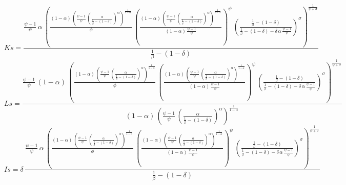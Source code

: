 \begin{dmath*}
Ks = \frac{\frac{{{\psi}}-1}{{{\psi}}}\, {{\alpha}}\, \left(\frac{\left(1-{{\alpha}}\right)\, \left(\frac{{{\psi}}-1}{{{\psi}}}\, \left(\frac{{{\alpha}}}{\frac{1}{{{\beta}}}-\left(1-{{\delta}}\right)}\right)^{{{\alpha}}}\right)^{\frac{1}{1-{{\alpha}}}}}{{{\phi}}}\, \left(\frac{\left(1-{{\alpha}}\right)\, \left(\frac{{{\psi}}-1}{{{\psi}}}\, \left(\frac{{{\alpha}}}{\frac{1}{{{\beta}}}-\left(1-{{\delta}}\right)}\right)^{{{\alpha}}}\right)^{\frac{1}{1-{{\alpha}}}}}{\left(1-{{\alpha}}\right)\, \frac{{{\psi}}-1}{{{\psi}}}}\right)^{{{\psi}}}\, \left(\frac{\frac{1}{{{\beta}}}-\left(1-{{\delta}}\right)}{\frac{1}{{{\beta}}}-\left(1-{{\delta}}\right)-{{\delta}}\, {{\alpha}}\, \frac{{{\psi}}-1}{{{\psi}}}}\right)^{{{\sigma}}}\right)^{\frac{1}{{{\psi}}+{{\sigma}}}}}{\frac{1}{{{\beta}}}-\left(1-{{\delta}}\right)}
\end{dmath*}
\begin{dmath*}
Ls = \frac{\frac{{{\psi}}-1}{{{\psi}}}\, \left(1-{{\alpha}}\right)\, \left(\frac{\left(1-{{\alpha}}\right)\, \left(\frac{{{\psi}}-1}{{{\psi}}}\, \left(\frac{{{\alpha}}}{\frac{1}{{{\beta}}}-\left(1-{{\delta}}\right)}\right)^{{{\alpha}}}\right)^{\frac{1}{1-{{\alpha}}}}}{{{\phi}}}\, \left(\frac{\left(1-{{\alpha}}\right)\, \left(\frac{{{\psi}}-1}{{{\psi}}}\, \left(\frac{{{\alpha}}}{\frac{1}{{{\beta}}}-\left(1-{{\delta}}\right)}\right)^{{{\alpha}}}\right)^{\frac{1}{1-{{\alpha}}}}}{\left(1-{{\alpha}}\right)\, \frac{{{\psi}}-1}{{{\psi}}}}\right)^{{{\psi}}}\, \left(\frac{\frac{1}{{{\beta}}}-\left(1-{{\delta}}\right)}{\frac{1}{{{\beta}}}-\left(1-{{\delta}}\right)-{{\delta}}\, {{\alpha}}\, \frac{{{\psi}}-1}{{{\psi}}}}\right)^{{{\sigma}}}\right)^{\frac{1}{{{\psi}}+{{\sigma}}}}}{\left(1-{{\alpha}}\right)\, \left(\frac{{{\psi}}-1}{{{\psi}}}\, \left(\frac{{{\alpha}}}{\frac{1}{{{\beta}}}-\left(1-{{\delta}}\right)}\right)^{{{\alpha}}}\right)^{\frac{1}{1-{{\alpha}}}}}
\end{dmath*}
\begin{dmath*}
Is = {{\delta}}\, \frac{\frac{{{\psi}}-1}{{{\psi}}}\, {{\alpha}}\, \left(\frac{\left(1-{{\alpha}}\right)\, \left(\frac{{{\psi}}-1}{{{\psi}}}\, \left(\frac{{{\alpha}}}{\frac{1}{{{\beta}}}-\left(1-{{\delta}}\right)}\right)^{{{\alpha}}}\right)^{\frac{1}{1-{{\alpha}}}}}{{{\phi}}}\, \left(\frac{\left(1-{{\alpha}}\right)\, \left(\frac{{{\psi}}-1}{{{\psi}}}\, \left(\frac{{{\alpha}}}{\frac{1}{{{\beta}}}-\left(1-{{\delta}}\right)}\right)^{{{\alpha}}}\right)^{\frac{1}{1-{{\alpha}}}}}{\left(1-{{\alpha}}\right)\, \frac{{{\psi}}-1}{{{\psi}}}}\right)^{{{\psi}}}\, \left(\frac{\frac{1}{{{\beta}}}-\left(1-{{\delta}}\right)}{\frac{1}{{{\beta}}}-\left(1-{{\delta}}\right)-{{\delta}}\, {{\alpha}}\, \frac{{{\psi}}-1}{{{\psi}}}}\right)^{{{\sigma}}}\right)^{\frac{1}{{{\psi}}+{{\sigma}}}}}{\frac{1}{{{\beta}}}-\left(1-{{\delta}}\right)}
\end{dmath*}
